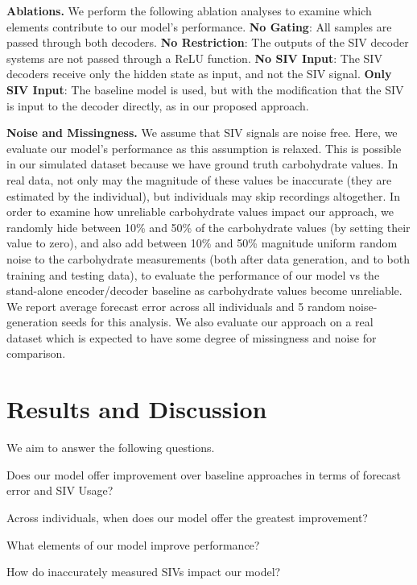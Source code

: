 \documentclass[letterpaper]{article}
\begin{document}
\textbf{Ablations.}  We perform the following ablation analyses to examine which elements contribute to our model's performance. \textbf{No Gating}: All samples are passed through both decoders. \textbf{No Restriction}: The outputs of the SIV decoder systems are not passed through a ReLU function. \textbf{No SIV Input}: The SIV decoders receive only the hidden state as input, and not the SIV signal. \textbf{Only SIV Input}: The baseline model is used, but with the modification that the SIV is input to the decoder directly, as in our proposed approach.

\textbf{Noise and Missingness.} We assume that SIV signals are noise free. Here, we evaluate our model's performance as this assumption is relaxed. This is possible in our simulated dataset because we have ground truth carbohydrate values. In real data, not only may the magnitude of these values be inaccurate (they are estimated by the individual), but individuals may skip recordings altogether. In order to examine how unreliable carbohydrate values impact our approach, we randomly hide between 10\% and 50\% of the carbohydrate values (by setting their value to zero), and also add between 10\% and 50\% magnitude uniform random noise to the carbohydrate measurements (both after data generation, and to both training and testing data), to evaluate the performance of our model vs the stand-alone encoder/decoder baseline as carbohydrate values become unreliable. We report average forecast error across all individuals and 5 random noise-generation seeds for this analysis. We also evaluate our approach on a real dataset which is expected to have some degree of missingness and noise for comparison.






\section{Results and Discussion}





We aim to answer the following questions.

Does our model offer improvement over baseline approaches in terms of forecast error and SIV Usage?

Across individuals, when does our model offer the greatest improvement?

What elements of our model improve performance?

How do inaccurately measured SIVs impact our model?
\end{document}
